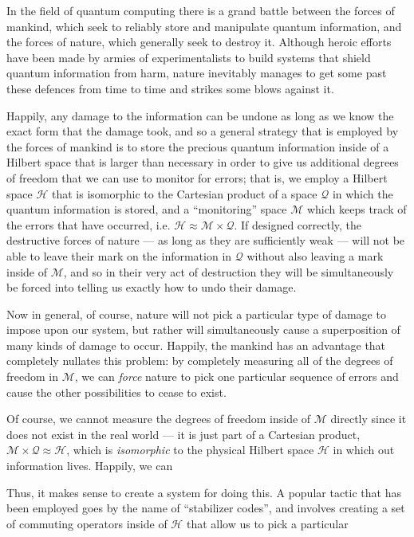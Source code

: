 \documentclass[twocolumn,showpacs,preprintnumbers,amsmath,amssymb,nofootinbib,pra,floatfix]{revtex4}
\begin{document}
In the field of quantum computing there is a grand battle between the forces of mankind, which seek to reliably store and manipulate quantum information, and the forces of nature, which generally seek to destroy it.  Although heroic efforts have been made by armies of experimentalists to build systems that shield quantum information from harm, nature inevitably manages to get some past these defences from time to time and strikes some blows against it.

Happily, any damage to the information can be undone as long as we know the exact form that the damage took, and so a general strategy that is employed by the forces of mankind is to store the precious quantum information inside of a Hilbert space that is larger than necessary in order to give us additional degrees of freedom that we can use to monitor for errors;  that is, we employ a Hilbert space $\mathscr{H}$ that is isomorphic to the Cartesian product of a space $\mathscr{Q}$ in which the quantum information is stored, and a ``monitoring'' space $\mathscr{M}$ which keeps track of the errors that have occurred, i.e. $\mathscr{H}\approx\mathscr{M}\times\mathscr{Q}$.  If designed correctly, the destructive forces of nature --- as long as they are sufficiently weak --- will not be able to leave their mark on the information in $\mathscr{Q}$ without also leaving a mark inside of $\mathscr{M}$, and so in their very act of destruction they will be simultaneously be forced into telling us exactly how to undo their damage.

Now in general, of course, nature will not pick a particular type of damage to impose upon our system, but rather will simultaneously cause a superposition of many kinds of damage to occur.  Happily, the mankind has an advantage that completely nullates this problem:  by completely measuring all of the degrees of freedom in $\mathscr{M}$, we can \emph{force} nature to pick one particular sequence of errors and cause the other possibilities to cease to exist.

Of course, we cannot measure the degrees of freedom inside of $\mathscr{M}$ directly since it does not exist in the real world --- it is just part of a Cartesian product, $\mathscr{M}\times\mathscr{Q}\approx\mathscr{H}$, which is \emph{isomorphic} to the physical Hilbert space $\mathscr{H}$ in which out information lives.  Happily, we can 

Thus, it makes sense to create a system for doing this.  A popular tactic that has been employed goes by the name of ``stabilizer codes'', and involves creating a set of commuting operators inside of $\mathscr{H}$ that allow us to pick a particular 
\end{document}
